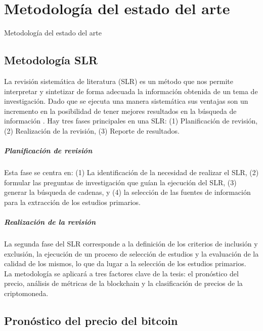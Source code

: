 \chapter[Metodología del estado del arte]{Metodología del estado del arte}{Metodología del estado del arte}\label{appen3}
\renewcommand{\tablename}{Tabla}


\section{Metodología SLR}

La revisión sistemática de literatura (SLR) es un método que nos permite interpretar y sintetizar de forma adecuada la información obtenida de un tema de investigación. Dado que se ejecuta una manera sistemática sus ventajas son un incremento en la posibilidad de tener mejores resultados en la búsqueda de información \parencite{kitchenhamSystematicLiteratureReviews2009}. Hay tres fases principales en una SLR: (1) Planificación de revisión, (2) Realización de la revisión, (3) Reporte de resultados.

\paragraph{Planificación de revisión}

Esta fase se centra en: (1) La identificación de la necesidad de realizar el SLR, (2) formular las preguntas de investigación que guían la ejecución del SLR, (3) generar la búsqueda de cadenas, y (4) la selección de las fuentes de información para la extracción de los estudios primarios.

\paragraph{Realización de la revisión}

La segunda fase del SLR corresponde a la definición de los criterios de inclusión y exclusión, la ejecución de un proceso de selección de estudios y la evaluación de la calidad de los mismos, lo que da lugar a la selección de los estudios primarios.\\

La metodología se aplicará a tres factores clave de la tesis: el pronóstico del precio, análisis de métricas de la blockchain y la clasificación de precios de la criptomoneda. 


\section{Pronóstico del precio del bitcoin}

